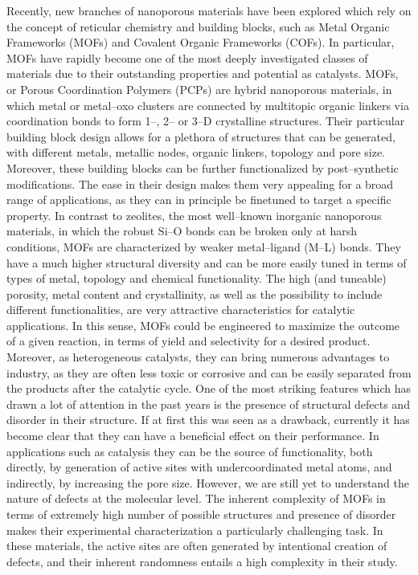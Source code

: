 Recently, new branches of nanoporous materials have been explored which rely on the concept of reticular chemistry and building blocks, such as Metal Organic Frameworks (MOFs) and Covalent Organic Frameworks (COFs). In particular, MOFs have rapidly become one of the most deeply investigated classes of materials due to their outstanding properties and potential as catalysts. MOFs, or Porous Coordination Polymers (PCPs) are hybrid nanoporous materials, in which metal or metal--oxo clusters are connected by multitopic organic linkers via coordination bonds to form 1--, 2-- or 3--D crystalline structures. Their particular building block design allows for a plethora of structures that can be generated, with different metals, metallic nodes, organic linkers, topology and pore size. Moreover, these building blocks can be further functionalized by post--synthetic modifications. The ease in their design makes them very appealing for a broad range of applications, as they can in principle be finetuned to target a specific property. In contrast to zeolites, the most well--known inorganic nanoporous materials, in which the robust Si--O bonds can be broken only at harsh conditions, MOFs are characterized by weaker metal--ligand (M--L) bonds. They have a much higher structural diversity and can be more easily tuned in terms of types of metal, topology and chemical functionality. The high (and tuneable) porosity, metal content and crystallinity, as well as the possibility to include different functionalities, are very attractive characteristics for catalytic applications. In this sense, MOFs could be engineered to maximize the outcome of a given reaction, in terms of yield and selectivity for a desired product. Moreover, as heterogeneous catalysts, they can bring numerous advantages to industry, as they are often less toxic or corrosive and can be easily separated from the products after the catalytic cycle. One of the most striking features which has drawn a lot of attention in the past years is the presence of structural defects and disorder in their structure. If at first this was seen as a drawback, currently it has become clear that they can have a beneficial effect on their performance. In applications such as catalysis they can be the source of functionality, both directly, by generation of active sites with undercoordinated metal atoms, and indirectly, by increasing the pore size. However, we are still yet to understand the nature of defects at the molecular level. 
\npar
The inherent complexity of MOFs in terms of extremely high number of possible structures and presence of disorder makes their experimental characterization a particularly challenging task. In these materials, the active sites are often generated by intentional creation of defects, and their inherent randomness entails a high complexity in their study. 

